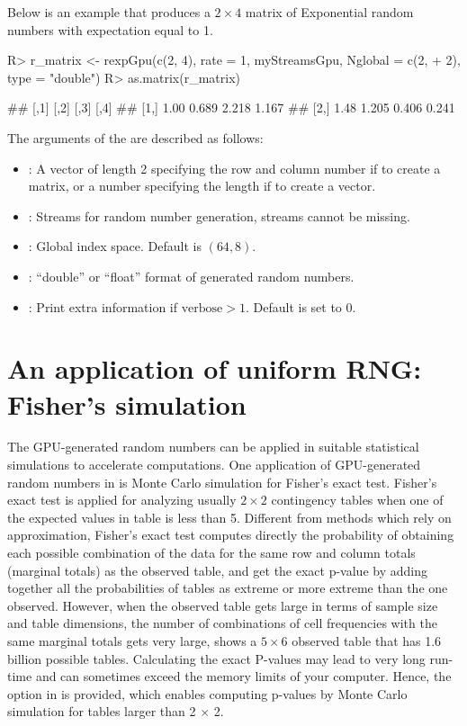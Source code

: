 \documentclass[article,nojss]{jss}\usepackage[]{graphicx}\usepackage[]{color}
\newcommand{\fct}[1]{\code{#1()}}
\begin{document}
Below is an example that produces a $2 \times 4$ matrix of Exponential random numbers with expectation equal to 1.
\begin{CodeChunk}
\begin{CodeInput}
R> r_matrix <- rexpGpu(c(2, 4), rate = 1, myStreamsGpu, Nglobal = c(2,
+    2), type = "double")
R> as.matrix(r_matrix)
\end{CodeInput}
\begin{CodeOutput}
##      [,1]  [,2]  [,3]  [,4]
## [1,] 1.00 0.689 2.218 1.167
## [2,] 1.48 1.205 0.406 0.241
\end{CodeOutput} 
\end{CodeChunk} 

The arguments of the \fct{rexpGpu} are described as follows:
\begin{itemize}
\itemsep0em 
  \item {}: A vector of length 2 specifying the row and column number if to create a matrix, or a number specifying the length if to create a vector.
  \item {}: Streams for random number generation, streams cannot be missing.
  \item {}: Global index space. Default is $(64,8)$.
  \item {}: ``double'' or ``float'' format of generated random numbers.
  \item {}: Print extra information if $\text{verbose} > 1$. Default is set to 0.
\end{itemize}





\section{An application of uniform RNG: Fisher's simulation}
The GPU-generated random numbers can be applied in suitable statistical simulations to accelerate computations.
One application of GPU-generated random numbers in  is Monte Carlo simulation for Fisher's exact test. Fisher’s exact test is applied for analyzing usually $2 \times 2$ contingency tables when one of the expected values in table is less than 5. Different from methods which rely on approximation, Fisher's exact test computes directly the probability of obtaining each possible combination of the data for the same row and column totals (marginal totals) as the observed table, and get the exact p-value by adding together all the probabilities of tables as extreme or more extreme than the one observed. However, when the observed table gets large in terms of sample size and table dimensions, the number of combinations of cell frequencies with the same marginal totals gets very large, \cite[][p. 23]{mehta2011ibm} shows a $5 \times 6$ observed table that has 1.6 billion possible tables. Calculating the exact P-values may lead to very long run-time and can sometimes exceed the memory limits of your computer. Hence, the option  in \fct{stats::fisher.test} is provided, which enables computing p-values by Monte Carlo simulation for tables larger than 2 $\times$ 2. 
\end{document}
